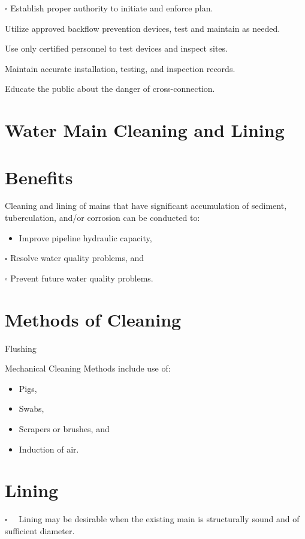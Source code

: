 \documentclass[10pt]{article}
\begin{document}
$\square$ Establish proper authority to initiate and enforce plan.

Utilize approved backflow prevention devices, test and maintain as needed.

Use only certified personnel to test devices and inspect sites.

Maintain accurate installation, testing, and inspection records.

Educate the public about the danger of cross-connection.

\section{Water Main Cleaning and Lining}
\section{Benefits}
Cleaning and lining of mains that have significant accumulation of sediment, tuberculation, and/or corrosion can be conducted to:

\begin{itemize}
  \item Improve pipeline hydraulic capacity,
\end{itemize}
$\square$ Resolve water quality problems, and

$\square$ Prevent future water quality problems.

\section{Methods of Cleaning}
Flushing

Mechanical Cleaning Methods include use of:

\begin{itemize}
  \item Pigs,

  \item Swabs,

  \item Scrapers or brushes, and

  \item Induction of air.

\end{itemize}
\section{Lining}
$\square \quad$ Lining may be desirable when the existing main is structurally sound and of sufficient diameter.
\end{document}
